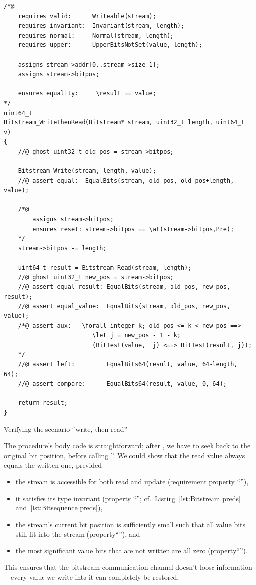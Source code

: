 \begin{listing}[hbt]
\begin{lstlisting}[style=acsl-block]
/*@
    requires valid:      Writeable(stream);
    requires invariant:  Invariant(stream, length);
    requires normal:     Normal(stream, length);
    requires upper:      UpperBitsNotSet(value, length);

    assigns stream->addr[0..stream->size-1];
    assigns stream->bitpos;

    ensures equality:     \result == value;
*/
uint64_t
Bitstream_WriteThenRead(Bitstream* stream, uint32_t length, uint64_t v)
{
    //@ ghost uint32_t old_pos = stream->bitpos;

    Bitstream_Write(stream, length, value);
    //@ assert equal:  EqualBits(stream, old_pos, old_pos+length, value);

    /*@ 
        assigns stream->bitpos;
        ensures reset: stream->bitpos == \at(stream->bitpos,Pre);
    */
    stream->bitpos -= length;

    uint64_t result = Bitstream_Read(stream, length);
    //@ ghost uint32_t new_pos = stream->bitpos;
    //@ assert equal_result: EqualBits(stream, old_pos, new_pos, result);
    //@ assert equal_value:  EqualBits(stream, old_pos, new_pos, value);
    /*@ assert aux:   \forall integer k; old_pos <= k < new_pos ==>
                         \let j = new_pos - 1 - k;
                         (BitTest(value,  j) <==> BitTest(result, j));
    */
    //@ assert left:         EqualBits64(result, value, 64-length, 64);
    //@ assert compare:      EqualBits64(result, value, 0, 64);

    return result;
}
\end{lstlisting}
\caption{\label{lst:Bitstream_WriteThenRead}
	Verifying the scenario ``write, then read'' }
\end{listing}

\FloatBarrier

The procedure's body code is straightforward; after
, we have to seek back to the original bit
position, before calling ''.
%
We could show that the read value always equals the written one,
provided
\begin{itemize}
\item the stream is accessible for both read and update
	(requirement property ``''),
\item it satisfies its type invariant (property
	``''; cf.\ Listing~\ref{lst:Bitstream preds}
	and~\ref{lst:Bitsequence preds}),
\item the stream's current bit position is sufficiently small such that
	all value bits still fit into the stream
	(property``''), and
\item the most significant value bits that are not written are all zero
	(property``'').
\end{itemize}
%
This ensures that the bitstream communication channel doesn't loose
information---every value we write into it can completely be
restored.


